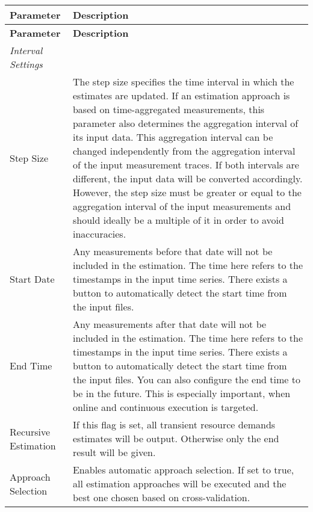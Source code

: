     \begin{tabularx}{\textwidth}{lX}
        
        \toprule
        \textbf{Parameter} & \textbf{Description} \\
        \midrule
        \endfirsthead %
        \toprule
        \textbf{Parameter} & \textbf{Description} \\
        \midrule
        \endhead %
        \bottomrule
        \endfoot
        \textit{Interval Settings} \\
        Step Size &  The step size specifies the time interval in which
        the estimates are updated. If an estimation approach
        is based on time-aggregated measurements,
        this parameter also determines the aggregation interval
        of its input data. This aggregation interval
        can be changed independently from the aggregation
        interval of the input measurement traces. If
        both intervals are different, the input data will be
        converted accordingly. However, the step size must
        be greater or equal to the aggregation interval of
        the input measurements and should ideally be a
        multiple of it in order to avoid inaccuracies.\\
        Start Date &  Any measurements before that date will not be
        included in the estimation. The time here refers
        to the timestamps in the input time series.
        There exists a button to automatically detect the  start time from the input files.\\
        End Time & Any measurements after that date will not be included
        in the estimation. The time here refers
        to the timestamps in the input time series.
        There exists a button to automatically detect the  start time from the input files. You can also configure the end time to be in the future. This is especially important, when online and continuous execution is targeted.
\\
        Recursive Estimation & If this flag is set, all transient resource demands
        estimates will be output. Otherwise only the end
        result will be given. \\
        Approach Selection & Enables automatic approach selection. If set to true, all estimation approaches will be executed and the best one chosen based on cross-validation. \\

\end{tabularx}
